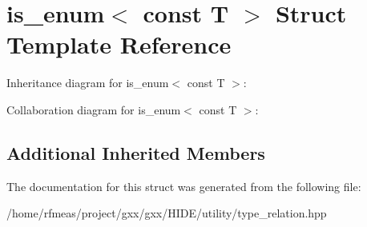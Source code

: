 \hypertarget{structis__enum_3_01const_01T_01_4}{}\section{is\+\_\+enum$<$ const T $>$ Struct Template Reference}
\label{structis__enum_3_01const_01T_01_4}


Inheritance diagram for is\+\_\+enum$<$ const T $>$\+:


Collaboration diagram for is\+\_\+enum$<$ const T $>$\+:
\subsection*{Additional Inherited Members}


The documentation for this struct was generated from the following file\+:\begin{DoxyCompactItemize}
\item 
/home/rfmeas/project/gxx/gxx/\+H\+I\+D\+E/utility/type\+\_\+relation.\+hpp\end{DoxyCompactItemize}
